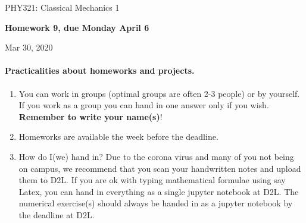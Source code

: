 \documentclass[%
oneside,                 %
final,                   %
10pt]{article}
\begin{document}

\newcommand{\exercisesection}[1]{\subsection*{#1}}






\thispagestyle{empty}

\begin{center}
{\LARGE\bf
\begin{spacing}{1.25}
PHY321: Classical Mechanics 1
\end{spacing}
}
\end{center}


\begin{center}
{\bf Homework 9, due Monday  April 6${}^{}$} \\ [0mm]
\end{center}

\begin{center}
\end{center}
    

\begin{center}
Mar 30, 2020
\end{center}

\vspace{1cm}


\paragraph{Practicalities about  homeworks and projects.}
\begin{enumerate}
\item You can work in groups (optimal groups are often 2-3 people) or by yourself. If you work as a group you can hand in one answer only if you wish. \textbf{Remember to write your name(s)}!

\item Homeworks are available  the week before the deadline. 

\item How do I(we)  hand in?  Due to the corona virus and many of you not being on campus, we recommend that you scan your handwritten notes and upload them to D2L. If you are ok with typing mathematical formulae using say Latex, you can hand in everything as a single jupyter notebook at D2L. The numerical exercise(s) should always be handed in as a jupyter notebook by the deadline at D2L. 
\end{enumerate}
\end{document}
